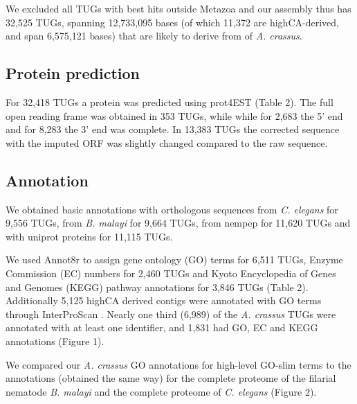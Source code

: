 \documentclass[10pt]{bmc_article}
\newenvironment{bmcformat}{\begin{raggedright}\baselineskip20pt\sloppy\setboolean{publ}{false}}{\end{raggedright}\baselineskip20pt\sloppy}
\begin{document}
\begin{bmcformat}
We excluded all TUGs with best hits outside Metazoa and our assembly
thus has 32,525 TUGs, spanning
12,733,095
bases (of which 11,372 are
highCA-derived, and span
6,575,121
bases) that are likely to derive from of \textit{A. crassus}.

\subsection*{Protein prediction}
















For
32,418
TUGs a protein was predicted using prot4EST
\cite{wasmuth_prot4est:_2004} (Table 2). The full open reading frame
was obtained in
353 TUGs,
while while for
2,683 the 5’ end
and for 8,283 the
3' end was complete. In 13,383 TUGs the
corrected sequence with the imputed ORF was slightly changed compared
to the raw sequence.

\subsection*{Annotation}

We obtained basic annotations with orthologous sequences from
\textit{C. elegans} for
9,556
TUGs, from \textit{B. malayi} for
9,664
TUGs, from nempep \cite{parkinson_nembase:resource_2004, pmid21550347}
for
11,620
TUGs and with uniprot proteins for
11,115
TUGs.

We used Annot8r \cite{schmid_annot8r:_2008} to assign gene ontology
(GO) terms for 6,511 TUGs, Enzyme Commission (EC) numbers
for 2,460 TUGs and Kyoto Encyclopedia of Genes and Genomes
(KEGG) pathway annotations for 3,846 TUGs (Table
2). Additionally 5,125 highCA derived contigs were
annotated with GO terms through InterProScan
\cite{pmid11590104}. Nearly one third (6,989) of
the \textit{A. crassus} TUGs were annotated with at least one
identifier, and 1,831 had GO, EC and KEGG
annotations (Figure 1).

We compared our \textit{A. crassus} GO annotations for high-level
GO-slim terms to the annotations (obtained the same way) for the
complete proteome of the filarial nematode \textit{B. malayi} and the
complete proteome of \textit{C. elegans} (Figure 2).


\end{bmcformat}
\end{document}
